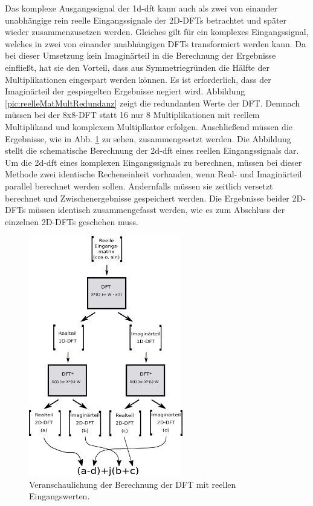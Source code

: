 Das komplexe Ausgangssignal der \gls{1d-dft} kann auch als zwei von einander unabhängige rein reelle Eingangssignale der 2D-DFTs betrachtet und später 
wieder zusammenzusetzen werden. Gleiches gilt für ein komplexes Eingangssignal, welches in zwei von einander unabhängigen DFTs transformiert werden kann.
Da bei dieser Umsetzung kein Imaginärteil in die Berechnung der Ergebnisse einfließt, hat sie den Vorteil, dass aus Symmetriegründen die Hälfte der Multiplikationen 
eingespart werden können. Es ist erforderlich, dass der Imaginärteil der gespiegelten Ergebnisse negiert wird. Abbildung \ref{pic:reelleMatMultRedundanz} zeigt die 
redundanten Werte der DFT. Demnach müssen bei der 8x8-DFT statt 16 nur 8 Multiplikationen mit reellem Multiplikand und komplexem Multiplkator erfolgen.
Anschließend müssen die Ergebnisse, wie in Abb. \ref{pic:reelleDFT} zu sehen, zusammengesetzt werden. 
Die Abbildung stellt die schematische Berechnung der \gls{2d-dft} eines reellen Eingangssignals dar. 
Um die \gls{2d-dft} eines komplexen Eingangssignals zu berechnen, müssen bei dieser Methode zwei identische Recheneinheit vorhanden, wenn Real- und Imaginärteil parallel berechnet werden sollen.
Andernfalls müssen sie zeitlich versetzt berechnet und  Zwischenergebnisse gespeichert werden. 
Die Ergebnisse beider 2D-DFTs müssen identisch zusammengefasst werden, wie es zum Abschluss der einzelnen 2D-DFTs geschehen muss.

\begin{figure}[htbp]
 \centering
   \includegraphics[width=0.6\textwidth]{img/reelleMatMult.png}
 \caption{Veranschaulichung der Berechnung der DFT mit reellen Eingangswerten.}
 \label{pic:reelleDFT}
\end{figure}


